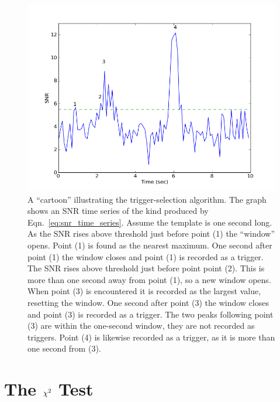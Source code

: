 \begin{figure}
  \includegraphics[width=\linewidth]{figures/search/snr_cartoon}
  \caption[The trigger-selection algorithm]{
  \label{f:snr_cartoon}
A ``cartoon'' illustrating the trigger-selection algorithm.  The graph
shows an SNR time series of the kind produced by
Eqn.~\ref{eq:snr_time_series}.  Assume the template is one second
long.  As the SNR rises above threshold just before point (1) the
``window'' opens.  Point (1) is found as the nearest maximum.  One
second after point (1) the window closes and point (1) is 
recorded as a trigger.  The SNR rises above threshold just
before point point (2).  This is more than one second away from point
(1), so a new window opens.  When point (3) is encountered it is
recorded as the largest value, resetting the window.  One second after
point (3) the window closes and point (3) is recorded as a trigger.
The two peaks following point (3) are within the one-second window,
they are not recorded as triggers.  Point (4) is likewise recorded as
a trigger, as it is more than one second from (3).
}
\end{figure}%



\section{The $\chi^2$ Test}
\label{sec:ihope_chisq}

